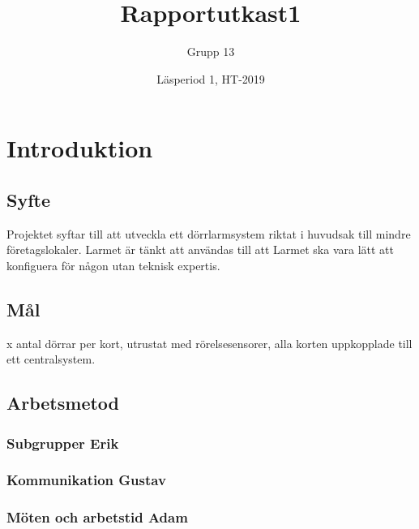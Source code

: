 \documentclass{article}
\title{Rapportutkast1}
\author{Grupp 13}
\date{Läsperiod 1, HT-2019}
\begin{document}
\maketitle
{}
\newpage

\tableofcontents
\newpage



\section{Introduktion}
\subsection{Syfte} %
Projektet syftar till att utveckla ett dörrlarmsystem riktat i huvudsak till mindre företagslokaler. Larmet är tänkt att användas till att
Larmet ska vara lätt att konfiguera för någon utan teknisk expertis.


\subsection{Mål} %
x antal dörrar per kort, utrustat med rörelsesensorer, alla korten uppkopplade till ett centralsystem.

\subsection{Arbetsmetod} %
\subsubsection{Subgrupper Erik}
\subsubsection{Kommunikation Gustav}
\subsubsection{Möten och arbetstid Adam}
\end{document}
